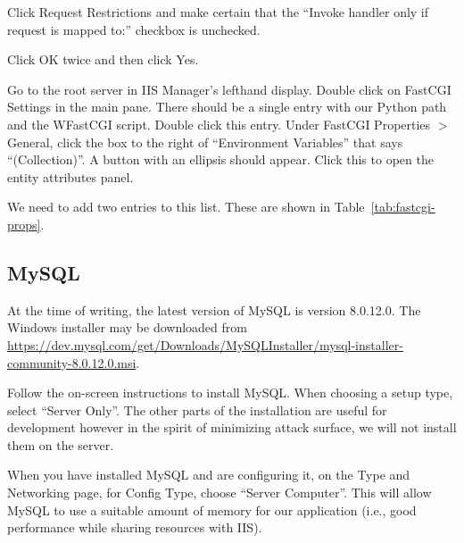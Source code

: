\documentclass{book}
\renewcommand{\,}{\kern0.2ex}
\begin{document}
	Click Request Restrictions and make certain that the ``Invoke handler only if request is mapped to:'' checkbox is unchecked.

	Click OK twice and then click Yes.
	
	Go to the root server in IIS Manager's lefthand display. Double click on FastCGI Settings in the main pane. There should be a single entry with our Python path and the WFastCGI script. Double click this entry. Under FastCGI Properties $>$ General, click the box to the right of ``Environment Variables'' that says ``(Collection)''. A button with an ellipsis should appear. Click this to open the entity attributes panel.
	
	We need to add two entries to this list. These are shown in Table~\ref{tab:fastcgi-props}.
	
	\begin{table}[ht!]
		\centering
		\caption{\label{tab:fastcgi-props}}
	\end{table}


	\subsection{MySQL}
	At the time of writing, the latest version of MySQL is version 8.0.12.0. The Windows installer may be downloaded from \url{https://dev.mysql.com/get/Downloads/MySQLInstaller/mysql-installer-community-8.0.12.0.msi}.
	
	Follow the on-screen instructions to install MySQL. When choosing a setup type, select ``Server Only''. The other parts of the installation are useful for development however in the spirit of minimizing attack surface, we will not install them on the server.
	
	When you have installed MySQL and are configuring it, on the Type and Networking page, for Config Type, choose ``Server Computer''. This will allow MySQL to use a suitable amount of memory for our application (i.e., good performance while sharing resources with IIS).
	
	\begin{center}
	\end{center}
\end{document}

